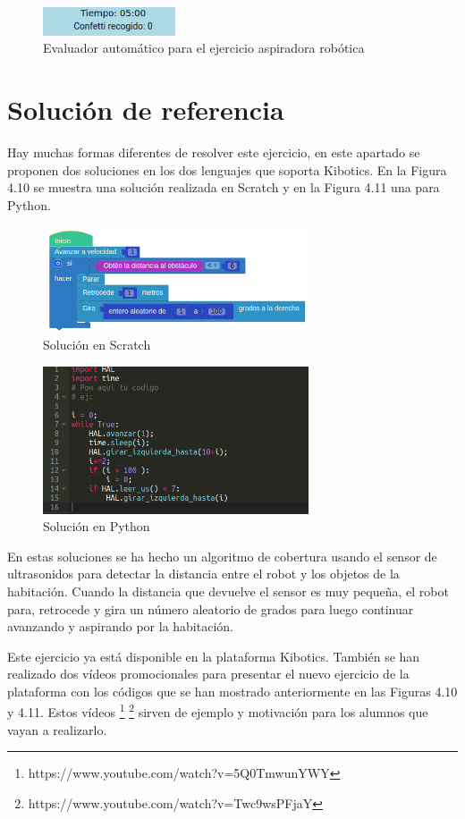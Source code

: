  \begin{figure}[H]
  \centering
 \includegraphics[width=0.35\textwidth]{chapters/images/evaluadoraspiradora.png}
  \caption{Evaluador automático para el ejercicio aspiradora robótica}
\end{figure}
\section{Solución de referencia}

Hay muchas formas diferentes  de resolver este ejercicio, en este apartado se proponen dos soluciones en los dos lenguajes que soporta Kibotics. En la Figura 4.10 se muestra una solución realizada en Scratch y en la Figura 4.11 una para Python.

\begin{figure}[H]
    \centering
    \includegraphics[width=0.7\textwidth, height=0.27\textwidth]{chapters/images/solucionroombascratch.png}
    \caption{Solución en Scratch }
    \label{fig:my_label}
\end{figure}
\begin{figure}[H]
    \centering
    \includegraphics[width=0.7\textwidth, height=0.27\textwidth]{chapters/images/solucionroombapython.png}
    \caption{Solución en Python}
    \label{fig:my_label}
\end{figure}

En estas soluciones se ha hecho un algoritmo de cobertura usando el sensor de ultrasonidos para detectar la distancia entre el robot y los objetos de la habitación. Cuando la distancia que devuelve el sensor es muy pequeña, el robot para, retrocede y gira un número aleatorio de grados para luego continuar avanzando y aspirando por la habitación.

Este ejercicio ya está disponible en la plataforma Kibotics. También se han realizado dos vídeos promocionales para presentar el nuevo ejercicio de la plataforma con los códigos que se han mostrado anteriormente en las Figuras 4.10 y 4.11. Estos vídeos \footnote{https://www.youtube.com/watch?v=5Q0TmwunYWY} \footnote{https://www.youtube.com/watch?v=Twc9wsPFjaY} sirven de ejemplo y motivación para los alumnos que vayan a realizarlo.